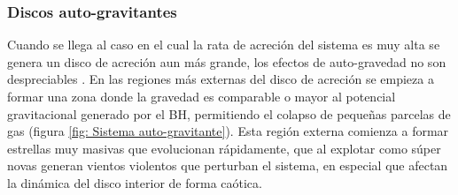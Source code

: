     \subsubsection{Discos auto-gravitantes}
    \label{subsubsec: Disco auto-gravitantes}
Cuando se llega al caso en el cual la rata de acreción del sistema es muy alta se genera un disco de acreción aun más grande, los efectos de auto-gravedad no son despreciables \cite{Bustamante2018b}. En las regiones más externas del disco de acreción se empieza a formar una zona donde la gravedad  es comparable o mayor al potencial gravitacional generado por el BH, permitiendo el colapso de pequeñas parcelas de gas
(figura \ref{fig: Sistema auto-gravitante}). Esta región externa comienza a formar estrellas muy masivas que evolucionan rápidamente, que al explotar como súper novas generan vientos  violentos que perturban el sistema, en especial que afectan la dinámica del disco interior de forma caótica. 
%
